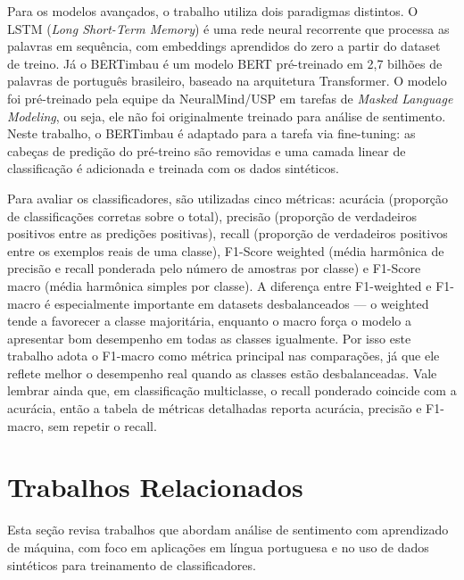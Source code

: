 \documentclass[12pt]{article}
\begin{document}
Para os modelos avançados, o trabalho utiliza dois paradigmas distintos. O LSTM (\textit{Long Short-Term Memory}) é uma rede neural recorrente que processa as palavras em sequência, com embeddings aprendidos do zero a partir do dataset de treino. Já o BERTimbau \cite{souza2022brazilian} é um modelo BERT pré-treinado em 2,7 bilhões de palavras de português brasileiro, baseado na arquitetura Transformer. O modelo foi pré-treinado pela equipe da NeuralMind/USP em tarefas de \textit{Masked Language Modeling}, ou seja, ele não foi originalmente treinado para análise de sentimento. Neste trabalho, o BERTimbau é adaptado para a tarefa via fine-tuning: as cabeças de predição do pré-treino são removidas e uma camada linear de classificação é adicionada e treinada com os dados sintéticos.

Para avaliar os classificadores, são utilizadas cinco métricas: acurácia (proporção de classificações corretas sobre o total), precisão (proporção de verdadeiros positivos entre as predições positivas), recall (proporção de verdadeiros positivos entre os exemplos reais de uma classe), F1-Score weighted (média harmônica de precisão e recall ponderada pelo número de amostras por classe) e F1-Score macro (média harmônica simples por classe). A diferença entre F1-weighted e F1-macro é especialmente importante em datasets desbalanceados — o weighted tende a favorecer a classe majoritária, enquanto o macro força o modelo a apresentar bom desempenho em todas as classes igualmente. Por isso este trabalho adota o F1-macro como métrica principal nas comparações, já que ele reflete melhor o desempenho real quando as classes estão desbalanceadas. Vale lembrar ainda que, em classificação multiclasse, o recall ponderado coincide com a acurácia, então a tabela de métricas detalhadas reporta acurácia, precisão e F1-macro, sem repetir o recall.



\section{Trabalhos Relacionados}
\label{sec:relacionados}

Esta seção revisa trabalhos que abordam análise de sentimento com aprendizado de máquina, com foco em aplicações em língua portuguesa e no uso de dados sintéticos para treinamento de classificadores.
\end{document}
